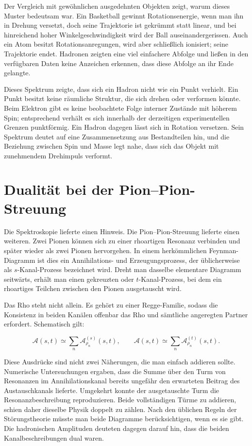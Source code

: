 Der Vergleich mit gewöhnlichen ausgedehnten Objekten zeigt, warum dieses Muster bedeutsam war. Ein Basketball gewinnt Rotationsenergie, wenn man ihn in Drehung versetzt, doch seine Trajektorie ist gekrümmt statt linear, und bei hinreichend hoher Winkelgeschwindigkeit wird der Ball auseinandergerissen. Auch ein Atom besitzt Rotationsanregungen, wird aber schließlich ionisiert; seine Trajektorie endet. Hadronen zeigten eine viel einfachere Abfolge und ließen in den verfügbaren Daten keine Anzeichen erkennen, dass diese Abfolge an ihr Ende gelangte.

Dieses Spektrum zeigte, dass sich ein Hadron nicht wie ein Punkt verhielt. Ein Punkt besitzt keine räumliche Struktur, die sich drehen oder verformen könnte. Beim Elektron gibt es keine beobachtete Folge interner Zustände mit höherem Spin; entsprechend verhält es sich innerhalb der derzeitigen experimentellen Grenzen punktförmig. Ein Hadron dagegen lässt sich in Rotation versetzen. Sein Spektrum deutet auf eine Zusammensetzung aus Bestandteilen hin, und die Beziehung zwischen Spin und Masse legt nahe, dass sich das Objekt mit zunehmendem Drehimpuls verformt.

\section{Dualität bei der Pion--Pion-Streuung}

Die Spektroskopie lieferte einen Hinweis. Die Pion--Pion-Streuung lieferte einen weiteren. Zwei Pionen können sich zu einer rhoartigen Resonanz verbinden und später wieder als zwei Pionen hervorgehen. In einem herkömmlichen Feynman-Diagramm ist dies ein Annihilations- und Erzeugungsprozess, der üblicherweise als \(s\)-Kanal-Prozess bezeichnet wird. Dreht man dasselbe elementare Diagramm seitwärts, erhält man einen gekreuzten oder \(t\)-Kanal-Prozess, bei dem ein rhoartiges Teilchen zwischen den Pionen ausgetauscht wird.

Das Rho steht nicht allein. Es gehört zu einer Regge-Familie, sodass die Konsistenz in beiden Kanälen offenbar das Rho und sämtliche angeregten Partner erfordert. Schematisch gilt:

\begin{equation}
  \mathcal A(s,t)\simeq
  \sum_n \mathcal A^{(s)}_{\rho_n}(s,t),
  \qquad
  \mathcal A(s,t)\simeq
  \sum_n \mathcal A^{(t)}_{\rho_n}(s,t).
  \label{eq:l01-channel-sums}
\end{equation}

Diese Ausdrücke sind nicht zwei Näherungen, die man einfach addieren sollte. Numerische Untersuchungen ergaben, dass die Summe über den Turm von Resonanzen im Annihilationskanal bereits ungefähr den erwarteten Beitrag des Austauschkanals lieferte. Umgekehrt konnte der ausgetauschte Turm die Resonanzbeschreibung reproduzieren. Beide vollständigen Türme zu addieren, schien daher dieselbe Physik doppelt zu zählen. Nach den üblichen Regeln der Störungstheorie müsste man beide Diagramme berücksichtigen, wenn es sie gibt. Die hadronischen Amplituden deuteten dagegen darauf hin, dass die beiden Kanalbeschreibungen dual waren.

